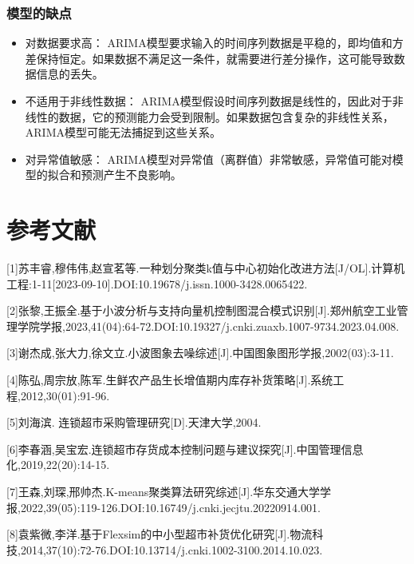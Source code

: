 \documentclass[withoutpreface,bwprint]{cumcmthesis} %
\begin{document}
\subsubsection{模型的缺点}
\begin{itemize}
	\item 对数据要求高： ARIMA模型要求输入的时间序列数据是平稳的，即均值和方差保持恒定。如果数据不满足这一条件，就需要进行差分操作，这可能导致数据信息的丢失。
	\item 不适用于非线性数据： ARIMA模型假设时间序列数据是线性的，因此对于非线性的数据，它的预测能力会受到限制。如果数据包含复杂的非线性关系，ARIMA模型可能无法捕捉到这些关系。
	\item 对异常值敏感： ARIMA模型对异常值（离群值）非常敏感，异常值可能对模型的拟合和预测产生不良影响。
\end{itemize}
	
	\section{参考文献}
[1]苏丰睿,穆伟伟,赵宣茗等.一种划分聚类k值与中心初始化改进方法[J/OL].计算机工程:1-11[2023-09-10].DOI:10.19678/j.issn.1000-3428.0065422.

[2]张黎,王振全.基于小波分析与支持向量机控制图混合模式识别[J].郑州航空工业管理学院学报,2023,41(04):64-72.DOI:10.19327/j.cnki.zuaxb.1007-9734.2023.04.008.

[3]谢杰成,张大力,徐文立.小波图象去噪综述[J].中国图象图形学报,2002(03):3-11.

[4]陈弘,周宗放,陈军.生鲜农产品生长增值期内库存补货策略[J].系统工程,2012,30(01):91-96.

[5]刘海滨. 连锁超市采购管理研究[D].天津大学,2004.

[6]李春涵,吴宝宏.连锁超市存货成本控制问题与建议探究[J].中国管理信息化,2019,22(20):14-15.

[7]王森,刘琛,邢帅杰.K-means聚类算法研究综述[J].华东交通大学学报,2022,39(05):119-126.DOI:10.16749/j.cnki.jecjtu.20220914.001.

[8]袁紫微,李洋.基于Flexsim的中小型超市补货优化研究[J].物流科技,2014,37(10):72-76.DOI:10.13714/j.cnki.1002-3100.2014.10.023.
\end{document}

